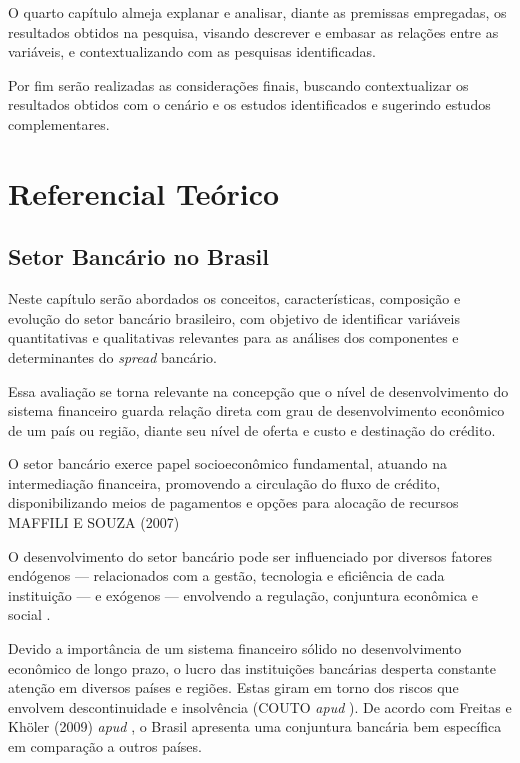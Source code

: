 \documentclass[12pt,openright,oneside,a4paper,chapter=TITLE,section=TITLE,subsection=TITLE,english,french,spanish,portugues,sumario=tradicional]{abntex2}
\begin{document}
O quarto capítulo almeja explanar e analisar, diante as premissas empregadas, os resultados obtidos na pesquisa, visando descrever e embasar as relações entre as variáveis, e contextualizando com as pesquisas identificadas.

Por fim serão realizadas as considerações finais, buscando contextualizar os resultados obtidos com o cenário e os estudos identificados e sugerindo estudos complementares.

\textual
\pagestyle{simple}

\chapter{Referencial Teórico}

\section{Setor Bancário no Brasil}

Neste capítulo serão abordados os conceitos, características, composição e
evolução do setor bancário brasileiro, com objetivo de identificar variáveis
quantitativas e qualitativas relevantes para as análises dos componentes e
determinantes do \emph{spread} bancário.

Essa avaliação se torna relevante na concepção que o nível de desenvolvimento
do sistema financeiro guarda relação direta com grau de desenvolvimento
econômico de um país ou região, diante seu nível de oferta e custo e destinação do crédito.

O setor bancário exerce papel socioeconômico fundamental, atuando na
intermediação financeira, promovendo a circulação do fluxo de crédito,
disponibilizando meios de pagamentos e opções para alocação de recursos MAFFILI
E SOUZA (2007)

O desenvolvimento do setor bancário pode ser influenciado por diversos fatores
endógenos --- relacionados com a gestão, tecnologia e eficiência de cada
instituição --- e exógenos --- envolvendo a regulação, conjuntura econômica e
social \cite{rover:2011}.

Devido a importância de um sistema financeiro sólido no desenvolvimento
econômico de longo prazo, o lucro das instituições bancárias desperta constante
atenção em diversos países e regiões. Estas giram em torno dos riscos que
envolvem descontinuidade e insolvência (COUTO \emph{apud} \cite{dantas:2012}). De
acordo com Freitas e Khöler (2009) \emph{apud} \textcite{dantas:2012}, o Brasil
apresenta uma conjuntura bancária bem específica em comparação a outros países.
\end{document}
